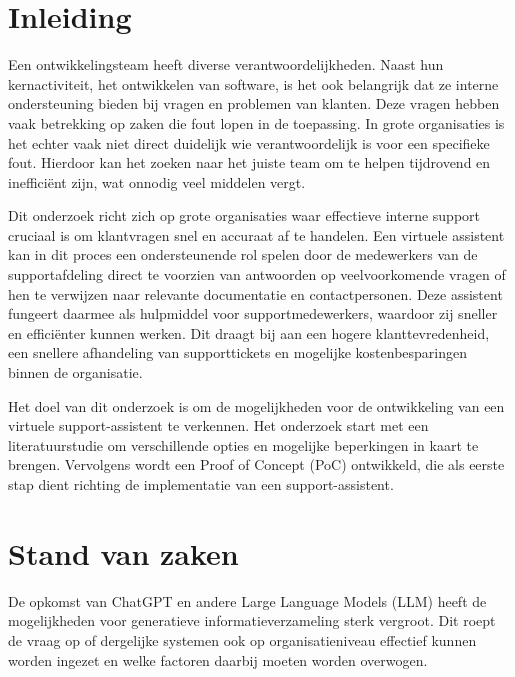 
\section{Inleiding}%
\label{sec:inleiding}

Een ontwikkelingsteam heeft diverse verantwoordelijkheden. Naast hun kernactiviteit, het ontwikkelen van software, is het ook belangrijk dat ze interne ondersteuning bieden bij vragen en problemen van klanten. Deze vragen hebben vaak betrekking op zaken die fout lopen in de toepassing. In grote organisaties is het echter vaak niet direct duidelijk wie verantwoordelijk is voor een specifieke fout. Hierdoor kan het zoeken naar het juiste team om te helpen tijdrovend en inefficiënt zijn, wat onnodig veel middelen vergt.

Dit onderzoek richt zich op grote organisaties waar effectieve interne support cruciaal is om klantvragen snel en accuraat af te handelen. Een virtuele assistent kan in dit proces een ondersteunende rol spelen door de medewerkers van de supportafdeling direct te voorzien van antwoorden op veelvoorkomende vragen of hen te verwijzen naar relevante documentatie en contactpersonen. Deze assistent fungeert daarmee als hulpmiddel voor supportmedewerkers, waardoor zij sneller en efficiënter kunnen werken. Dit draagt bij aan een hogere klanttevredenheid, een snellere afhandeling van supporttickets en mogelijke kostenbesparingen binnen de organisatie.

Het doel van dit onderzoek is om de mogelijkheden voor de ontwikkeling van een virtuele support-assistent te verkennen. Het onderzoek start met een literatuurstudie om verschillende opties en mogelijke beperkingen in kaart te brengen. Vervolgens wordt een Proof of Concept (PoC) ontwikkeld, die als eerste stap dient richting de implementatie van een support-assistent.


\section{Stand van zaken}%
\label{sec:stand van zaken}

De opkomst van ChatGPT en andere Large Language Models (LLM) heeft de mogelijkheden voor generatieve informatieverzameling sterk vergroot. Dit roept de vraag op of dergelijke systemen ook op organisatieniveau effectief kunnen worden ingezet en welke factoren daarbij moeten worden overwogen.

